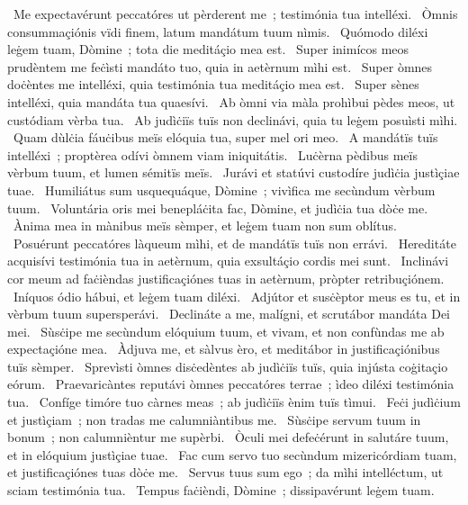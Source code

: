 {~Me expectavérunt peccatóres ut pèrderent me~; testimónia tua intelléxi. 
~Òmnis consummaçiónis vïdi finem, latum mandátum tuum nìmis. 
~Quómodo diléxi leġem tuam, Dòmine~; tota die meditáçio mea est. 
~Super inimícos meos prudèntem me feċìsti mandáto tuo, quia in aetèrnum mìhi est. 
~Super òmnes doċèntes me intelléxi, quia testimónia tua meditáçio mea est. 
~Super sènes intelléxi, quia mandáta tua quaesívi. 
~Ab òmni via màla prohìbui pèdes meos, ut custódiam vèrba tua. 
~Ab judìċiïs tuïs non declinávi, quia tu leġem posuìsti mìhi. 
~Quam dùlċia fáuċibus meïs elóquia tua, super mel ori meo. 
~A mandátïs tuïs intelléxi~; proptèrea odívi òmnem viam iniquitátis. 
~Luċèrna pèdibus meïs vèrbum tuum, et lumen sémitïs meïs. 
~Jurávi et statúvi custodíre judìċia justìçiae tuae. 
~Humiliátus sum usquequáque, Dòmine~; vivìfica me secùndum vèrbum tuum. 
~Voluntária oris mei benepláċita fac, Dòmine, et judìċia tua dòċe me. 
~Ànima mea in mànibus meïs sèmper, et leġem tuam non sum oblítus. 
~Posuérunt peccatóres làqueum mìhi, et de mandátïs tuïs non errávi. 
~Hereditáte acquisívi testimónia tua in aetèrnum, quia exsultáçio cordis mei sunt. 
~Inclinávi cor meum ad faċièndas justificaçiónes tuas in aetèrnum, pròpter retribuçiónem. 
~Iníquos ódio hábui, et leġem tuam diléxi. 
~Adjútor et susċèptor meus es tu, et in vèrbum tuum supersperávi. 
~Declináte a me, malígni, et scrutábor mandáta Dei mei. 
~Sùsċipe me secùndum elóquium tuum, et vivam, et non confùndas me ab expectaçióne mea. 
~Àdjuva me, et sàlvus èro, et meditábor in justificaçiónibus tuïs sèmper. 
~Sprevìsti òmnes disċedèntes ab judìċiïs tuïs, quia injústa coġitaçio eórum. 
~Praevaricàntes reputávi òmnes peccatóres terrae~; ìdeo diléxi testimónia tua. 
~Confíge timóre tuo càrnes meas~; ab judìċiïs ènim tuïs tìmui. 
~Feċi judìċium et justìçiam~; non tradas me calumniàntibus me. 
~Sùsċipe servum tuum in bonum~; non calumnièntur me supèrbi. 
~Òculi mei defeċérunt in salutáre tuum, et in elóquium justìçiae tuae. 
~Fac cum servo tuo secùndum mizericórdiam tuam, et justificaçiónes tuas dòċe me. 
~Servus tuus sum ego~; da mìhi intelléctum, ut sciam testimónia tua. 
~Tempus faċièndi, Dòmine~; dissipavérunt leġem tuam. 
}
